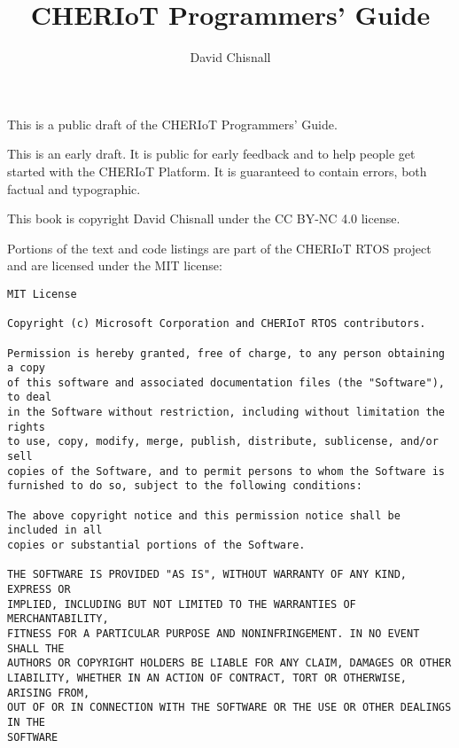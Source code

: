 \title{CHERIoT Programmers' Guide}
\author{David Chisnall}

This is a public draft of the CHERIoT Programmers' Guide.

\begin{warning}
This is an early draft.
It is public for early feedback and to help people get started with the CHERIoT Platform.
It is guaranteed to contain errors, both factual and typographic.
\end{warning}

This book is copyright David Chisnall under the CC BY-NC 4.0 license.

Portions of the text and code listings are part of the CHERIoT RTOS project and are licensed under the MIT license:

\begin{verbatim}
MIT License

Copyright (c) Microsoft Corporation and CHERIoT RTOS contributors.

Permission is hereby granted, free of charge, to any person obtaining a copy
of this software and associated documentation files (the "Software"), to deal
in the Software without restriction, including without limitation the rights
to use, copy, modify, merge, publish, distribute, sublicense, and/or sell
copies of the Software, and to permit persons to whom the Software is
furnished to do so, subject to the following conditions:

The above copyright notice and this permission notice shall be included in all
copies or substantial portions of the Software.

THE SOFTWARE IS PROVIDED "AS IS", WITHOUT WARRANTY OF ANY KIND, EXPRESS OR
IMPLIED, INCLUDING BUT NOT LIMITED TO THE WARRANTIES OF MERCHANTABILITY,
FITNESS FOR A PARTICULAR PURPOSE AND NONINFRINGEMENT. IN NO EVENT SHALL THE
AUTHORS OR COPYRIGHT HOLDERS BE LIABLE FOR ANY CLAIM, DAMAGES OR OTHER
LIABILITY, WHETHER IN AN ACTION OF CONTRACT, TORT OR OTHERWISE, ARISING FROM,
OUT OF OR IN CONNECTION WITH THE SOFTWARE OR THE USE OR OTHER DEALINGS IN THE
SOFTWARE
\end{verbatim}
















